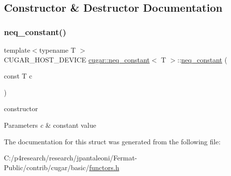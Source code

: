 \subsection{Constructor \& Destructor Documentation}
\mbox{\label{structcugar_1_1neq__constant_aedc7b9a2c797e8c34a66a37baefa50a1}} 
\subsubsection{\texorpdfstring{neq\+\_\+constant()}{neq\_constant()}}
{\footnotesize\ttfamily template$<$typename T $>$ \\
C\+U\+G\+A\+R\+\_\+\+H\+O\+S\+T\+\_\+\+D\+E\+V\+I\+CE \hyperlink{structcugar_1_1neq__constant}{cugar\+::neq\+\_\+constant}$<$ T $>$\+::\hyperlink{structcugar_1_1neq__constant}{neq\+\_\+constant} (\begin{DoxyParamCaption}\item[{const T}]{c }\end{DoxyParamCaption})\hspace{0.3cm}{\ttfamily [inline]}}

constructor


\begin{DoxyParams}{Parameters}
{\em c} & constant value \\
\hline
\end{DoxyParams}


The documentation for this struct was generated from the following file\+:\begin{DoxyCompactItemize}
\item 
C\+:/p4research/research/jpantaleoni/\+Fermat-\/\+Public/contrib/cugar/basic/\hyperlink{functors_8h}{functors.\+h}\end{DoxyCompactItemize}

